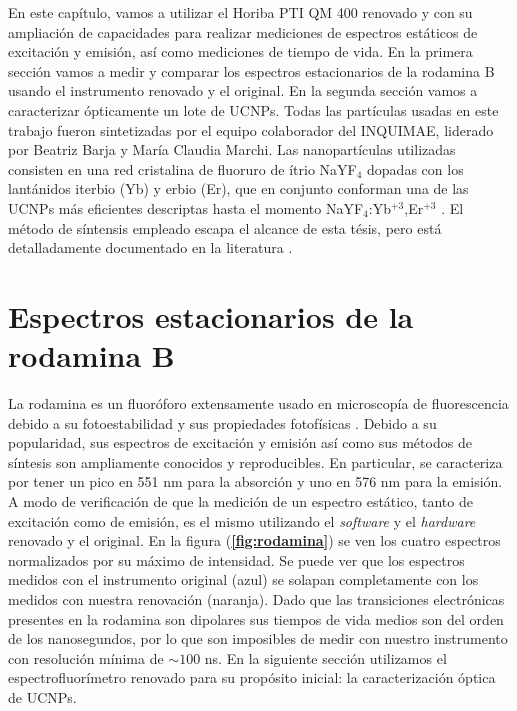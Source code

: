 

En este capítulo, vamos a utilizar el Horiba PTI QM 400 renovado y con su ampliación de capacidades para realizar mediciones de espectros estáticos de excitación y emisión, así como mediciones de tiempo de vida.
En la primera sección vamos a medir y comparar los espectros estacionarios de la rodamina B usando el instrumento renovado y el original.
En la segunda sección vamos a caracterizar ópticamente un lote de UCNPs.
Todas las partículas usadas en este trabajo fueron sintetizadas por el equipo colaborador del INQUIMAE, liderado por Beatriz Barja y María Claudia Marchi. 
Las nanopartículas utilizadas consisten en una red cristalina de fluoruro de ítrio NaYF$_4$ dopadas con los lantánidos iterbio (Yb) y erbio (Er), que en conjunto conforman una de las UCNPs más eficientes descriptas hasta el momento NaYF$_4$:Yb$^{+3}$,Er$^{+3}$ \cite{caracterizacion_ucnps_unicas}.
El método de síntensis empleado escapa el alcance de esta tésis, pero está detalladamente documentado en la literatura \cite{Zhang2012}.

\section{Espectros estacionarios de la rodamina B}

La rodamina es un fluoróforo extensamente usado en microscopía de fluorescencia debido a su fotoestabilidad y sus propiedades fotofísicas \cite{beija_synthesis_2009,rodamina_caracterizacion}.
Debido a su popularidad, sus espectros de excitación y emisión así como sus métodos de síntesis son ampliamente conocidos y reproducibles.
En particular, se caracteriza por tener un pico en 551 nm para la absorción y uno en 576 nm para la emisión.
A modo de verificación de que la medición de un espectro estático, tanto de excitación como de emisión, es el mismo utilizando el \textit{software} y el \textit{hardware} renovado y el original.
En la figura (\textbf{\ref{fig:rodamina}}) se ven los cuatro espectros normalizados por su máximo de intensidad.
Se puede ver que los espectros medidos con el instrumento original (azul) se solapan completamente con los medidos con nuestra renovación (naranja).
Dado que las transiciones electrónicas presentes en la rodamina son dipolares sus tiempos de vida medios son del orden de los nanosegundos, por lo que son imposibles de medir con nuestro instrumento con resolución mínima de $\sim 100$ ns.
En la siguiente sección utilizamos el espectrofluorímetro renovado para su propósito inicial: la caracterización óptica de UCNPs.

